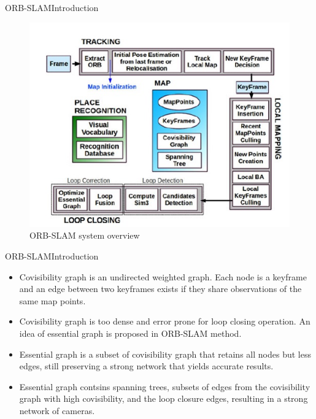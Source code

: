 \documentclass[aspectratio=169]{beamer}
\begin{document}
\begin{frame}{ORB-SLAM}{Introduction}
  \begin{figure}
\includegraphics[scale=0.6]{figs/ORB-SLAM}
\caption{ORB-SLAM system overview}
\end{figure}
  
\end{frame}

\begin{frame}{ORB-SLAM}{Introduction}
  \begin{itemize}
      \item{
      Covisibility graph is an undirected weighted graph. Each node is a keyframe and an edge between two keyframes exists if they share observations of the same map points.
      }
      \item{
      Covisibility graph is too dense and error prone for loop closing operation. An idea of essential graph is proposed in ORB-SLAM method.
      }
      \item{
      Essential graph is a subset of covisibility graph that retains all nodes but less edges, still preserving a strong network that yields accurate results. 
      }
      \item{
      Essential graph contsins spanning trees, subsets of edges from the covisibility graph with high covisibility, and the loop closure edges, resulting in a strong network of cameras.
      }
  \end{itemize}
\end{frame}
\end{document}
